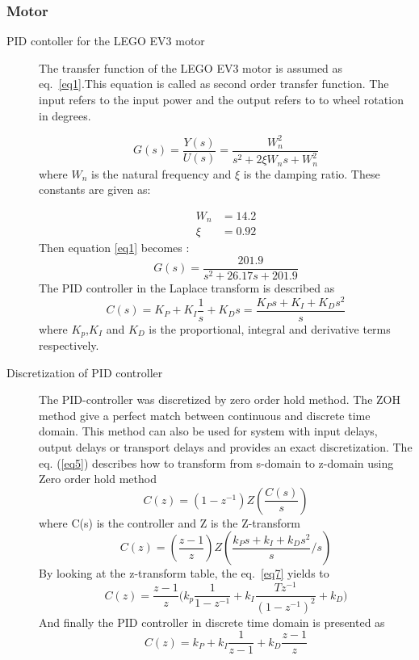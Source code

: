 \subsubsection{Motor}
\begin{description}
\item[PID contoller for the LEGO EV3 motor]
The transfer function of the LEGO EV3 motor is assumed as eq.~\eqref{eq1}.This equation is called as second order transfer function. The input refers to the input power and the output refers to to wheel rotation in degrees.

\begin{equation}\label{eq1}
    G(s)=\frac{Y(s)}{U(s)}=\frac{W_n^2}{s^2+2\xi W_n s + W_n^2}
\end{equation}
where $W_n$ is the natural frequency and $\xi$ is the damping ratio.  These constants are given as:

\begin{equation}
\begin{split}
     W_n & = 14.2 \\
    \xi & = 0.92
\end{split}
\end{equation}
Then equation \ref{eq1} becomes :
\begin{equation}
    G(s)=\frac{201.9}{s^2+26.17s+201.9}
\end{equation}
The PID controller in the Laplace transform is described as
    \begin{equation}
    C(s)= K_P+K_I \frac{1}{s}+K_Ds= \frac{K_Ps+K_I+K_Ds^2}{s}
\end{equation}
where $K_p$,$K_I$ and $K_D$ is the proportional, integral and derivative terms respectively.
\item[Discretization of PID controller]
The PID-controller was discretized by zero order hold method. The ZOH method give a perfect match between continuous and discrete time domain. This method can also be used for system with input delays, output delays or transport delays and provides an exact discretization.
The eq. (\ref{eq5}) describes how to transform from s-domain to z-domain using Zero order hold method
\begin{equation} \label{eq5}
    C(z)=(1-z^{-1}) Z(\frac{C(s)}{s})
\end{equation}
where C(s) is the controller and Z is the Z-transform
\begin{equation}
    C(z)=(\frac{z-1}{z})Z(\frac{k_Ps+k_I+k_Ds^2}{s} \Big/ s)
    \label{eq7}
\end{equation}
By looking at the z-transform table, the eq.~\eqref{eq7} yields to
\begin{equation}
    C(z)=\frac{z-1}{z}\bigg( k_p \frac{1}{1-z^{-1}}+k_I \frac{T z^{-1}}{(1-z^{-1})^2}+k_D\bigg)
\end{equation}
And finally the PID controller in discrete time domain is presented as
\begin{equation}
    C(z)= k_P + k_I \frac{1}{z-1} + k_D \frac{z-1}{z}
\end{equation}


\end{description}
